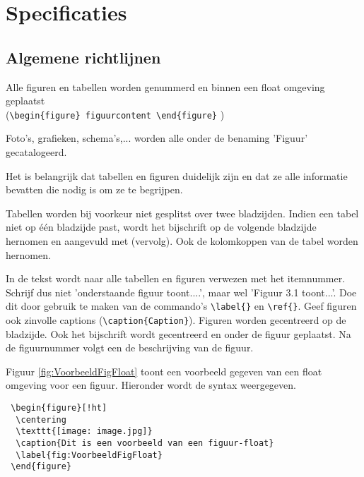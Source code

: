  
\chapter{Specificaties}
\section{Algemene richtlijnen}

 Alle figuren en tabellen worden genummerd en binnen een float omgeving geplaatst \\ (\verb|\begin{figure} figuurcontent \end{figure}| )
 
 Foto's, grafieken, schema's,... worden alle onder de benaming 'Figuur' 
 gecatalogeerd. 
 
 Het is belangrijk dat tabellen en figuren duidelijk zijn en dat ze alle informatie bevatten die nodig is om ze te begrijpen. 
 
 Tabellen worden bij voorkeur niet gesplitst over twee bladzijden. Indien een tabel niet op \'e\'en bladzijde past, wordt het bijschrift op de volgende bladzijde hernomen en aangevuld met (vervolg). Ook de kolomkoppen van de tabel worden hernomen.
 
 In de tekst wordt naar alle tabellen en figuren verwezen met het itemnummer. Schrijf dus niet 'onderstaande figuur toont....', maar wel 'Figuur 3.1 toont...'. Doe dit door gebruik te maken van de commando's \verb|\label{}| en \verb|\ref{}|. Geef figuren ook zinvolle captions (\verb|\caption{Caption}|).
 Figuren worden gecentreerd op de bladzijde. Ook het bijschrift wordt gecentreerd en onder de figuur geplaatst. Na de figuurnummer volgt een de beschrijving van de figuur. 
 
 Figuur \ref{fig:VoorbeeldFigFloat} toont een voorbeeld gegeven van een float omgeving voor een figuur. Hieronder wordt de syntax weergegeven.


\verb| \begin{figure}[!ht] |\\
\verb|	\centering|\\
\verb|	\texttt{[image: image.jpg]}|\\
\verb|	\caption{Dit is een voorbeeld van een figuur-float}|\\
\verb|	\label{fig:VoorbeeldFigFloat}|\\
\verb| \end{figure}|

